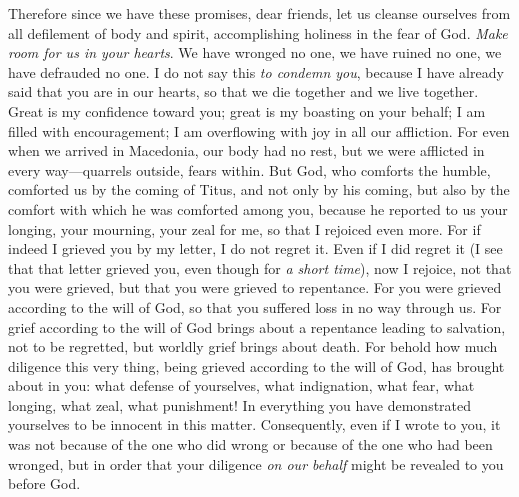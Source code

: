\begin{biblechapter} %
 Therefore since we have these promises, dear friends, let us cleanse ourselves from all defilement of body and spirit, accomplishing holiness in the fear of God.
\verse \textit{Make room for us in your hearts}. We have wronged no one, we have ruined no one, we have defrauded no one.
\verse I do not say this \textit{to condemn you}, because I have already said that you are in our hearts, so that we die together and we live together.
\verse Great is my confidence toward you; great is my boasting on your behalf; I am filled with encouragement; I am overflowing with joy in all our affliction.
\verse For even when we arrived in Macedonia, our body had no rest, but we were afflicted in every way—quarrels outside, fears within.
\verse But God, who comforts the humble, comforted us by the coming of Titus,
\verse and not only by his coming, but also by the comfort with which he was comforted among you, because he reported to us your longing, your mourning, your zeal for me, so that I rejoiced even more.
\verse For if indeed I grieved you by my letter, I do not regret it. Even if I did regret it (I see that that letter grieved you, even though for \textit{a short time}),
\verse now I rejoice, not that you were grieved, but that you were grieved to repentance. For you were grieved according to the will of God, so that you suffered loss in no way through us.
\verse For grief according to the will of God brings about a repentance leading to salvation, not to be regretted, but worldly grief brings about death.
\verse For behold how much diligence this very thing, being grieved according to the will of God, has brought about in you: what defense of yourselves, what indignation, what fear, what longing, what zeal, what punishment! In everything you have demonstrated yourselves to be innocent in this matter.
\verse Consequently, even if I wrote to you, it was not because of the one who did wrong or because of the one who had been wronged, but in order that your diligence \textit{on our behalf} might be revealed to you before God.

\end{biblechapter}
